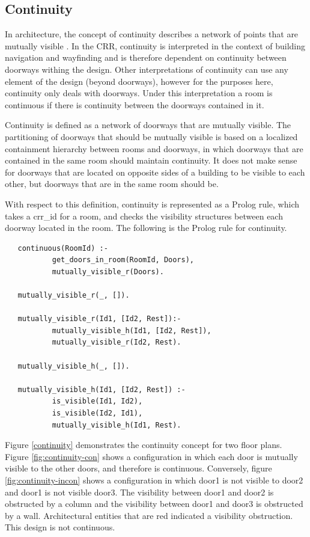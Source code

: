 \documentclass[12pt]{ucthesis}
\begin{document}
\subsection{Continuity}
In architecture, the concept of continuity describes a network of points that are mutually visible \cite{Key}. In the CRR, continuity is interpreted in the context of building navigation and wayfinding and is therefore dependent on continuity between doorways withing the design. Other interpretations of continuity can use any element of the design (beyond doorways), however for the purposes here, continuity only deals with doorways. Under this interpretation a room is continuous if there is continuity between the doorways contained in it. 

Continuity is defined as a network of doorways that are mutually visible. The partitioning of doorways that should be mutually visible is based on a localized containment hierarchy between rooms and doorways, in which doorways that are contained in the same room should maintain continuity. It does not make sense for doorways that are located on opposite sides of a building to be visible to each other, but doorways that are in the same room should be. 

With respect to this definition, continuity is represented as a Prolog rule, which takes a crr\_id for a room, and checks the visibility structures between each doorway located in the room. The following is the Prolog rule for continuity. 

\begin{verbatim}
   continuous(RoomId) :-
           get_doors_in_room(RoomId, Doors),
           mutually_visible_r(Doors).
 
   mutually_visible_r(_, []).

   mutually_visible_r(Id1, [Id2, Rest]):-
           mutually_visible_h(Id1, [Id2, Rest]),
           mutually_visible_r(Id2, Rest).

   mutually_visible_h(_, []).
   
   mutually_visible_h(Id1, [Id2, Rest]) :-
           is_visible(Id1, Id2),
           is_visible(Id2, Id1),
           mutually_visible_h(Id1, Rest).

\end{verbatim}

Figure \ref{continuity} demonstrates the continuity concept for two floor plans. Figure \ref{fig:continuity-con} shows a configuration in which each door is mutually visible to the other doors, and therefore is continuous. Conversely, figure \ref{fig:continuity-incon} shows a configuration in which door1 is not visible to door2 and door1 is not visible door3. The visibility between door1 and door2 is obstructed by a column and the visibility between door1 and door3 is obstructed by a wall. Architectural entities that are red indicated a visibility obstruction. This design is not continuous. 
\end{document}
